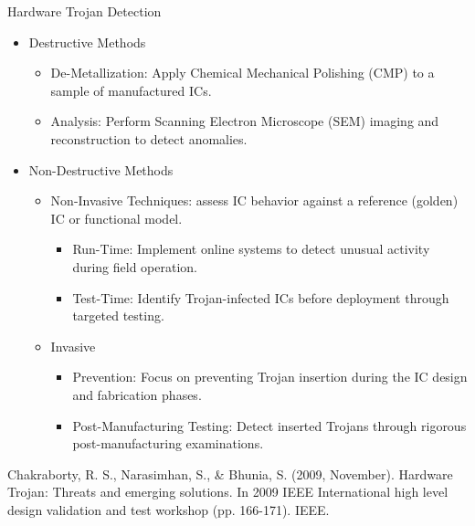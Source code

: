 \begin{frame}{Hardware Trojan Detection}
    \begin{itemize}
        \item Destructive Methods
        \begin{itemize}
            \item De-Metallization: Apply Chemical Mechanical Polishing (CMP) to a sample of manufactured ICs.
            \item Analysis: Perform Scanning Electron Microscope (SEM) imaging and reconstruction to detect anomalies.
        \end{itemize}
        \item Non-Destructive Methods
        \begin{itemize}
            \item Non-Invasive Techniques: assess IC behavior against a reference (golden) IC or functional model.
            \begin{itemize}
                \item Run-Time: Implement online systems to detect unusual activity during field operation.
                \item Test-Time: Identify Trojan-infected ICs before deployment through targeted testing.
            \end{itemize}
            \item Invasive
            \begin{itemize}
                \item Prevention: Focus on preventing Trojan insertion during the IC design and fabrication phases.
                \item Post-Manufacturing Testing: Detect inserted Trojans through rigorous post-manufacturing examinations.
            \end{itemize}
        \end{itemize}
    \end{itemize}
\vfill
{\small Chakraborty, R. S., Narasimhan, S., \& Bhunia, S. (2009, November). Hardware Trojan: Threats and emerging solutions. In 2009 IEEE International high level design validation and test workshop (pp. 166-171). IEEE.}
\end{frame}

